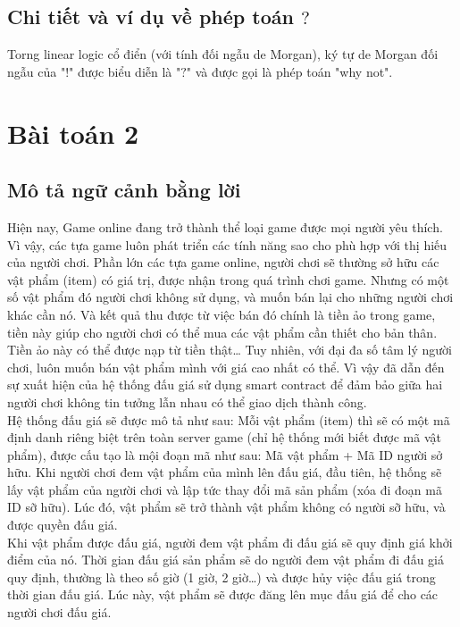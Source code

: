 \documentclass[a4paper]{article}
\begin{document}
\subsection{Chi tiết và ví dụ về phép toán $?$}
Torng linear logic cổ điển (với tính đối ngẫu de Morgan), ký tự de Morgan đối ngẫu của "$!$" được biểu diễn là "$?$" và được gọi là phép toán "why not".


\section{Bài toán 2}
\subsection{Mô tả ngữ cảnh bằng lời}

Hiện nay, Game online đang trở thành thể loại game được mọi người yêu thích. Vì vậy, các tựa game luôn phát triển các tính năng sao cho phù hợp với thị hiếu của người chơi. Phần lớn các tựa game online, người chơi sẽ thường sở hữu các vật phẩm (item) có giá trị, được nhận trong quá trình chơi game. Nhưng có một số vật phẩm đó người chơi không sử dụng, và muốn bán lại cho những người chơi khác cần nó. Và kết quả thu được từ việc bán đó chính là tiền ảo trong game, tiền này giúp cho người chơi có thể mua các vật phẩm cần thiết cho bản thân. Tiền ảo này có thể được nạp từ tiền thật… Tuy nhiên, với đại đa số tâm lý người chơi, luôn muốn bán vật phẩm mình với giá cao nhất có thể. Vì vậy đã dẫn đến sự xuất hiện của hệ thống đấu giá sử dụng smart contract để đảm bảo giữa hai người chơi không tin tưởng lẫn nhau có thể giao dịch thành công.\\

	Hệ thống đấu giá sẽ được mô tả như sau: Mỗi vật phẩm (item) thì sẽ có một mã định danh riêng biệt trên toàn server game (chỉ hệ thống mới biết được mã vật phẩm), được cấu tạo là mội đoạn mã như sau: Mã vật phẩm +  Mã ID người sở hữu. Khi người chơi đem vật phẩm của mình lên đấu giá, đầu tiên, hệ thống sẽ lấy vật phẩm của người chơi và lập tức thay đổi mã sản phẩm (xóa đi đoạn mã ID sỡ hữu). Lúc đó, vật phẩm sẽ trở thành vật phẩm không có người sỡ hữu, và được quyền đấu giá.  \\
	
Khi vật phẩm được đấu giá, người đem vật phẩm đi đấu giá sẽ quy định giá khởi điểm của nó. Thời gian đấu giá sản phẩm sẽ do người đem vật phẩm đi đấu giá quy định, thường là theo số giờ (1 giờ, 2 giờ…) và được hủy việc đấu giá trong thời gian đấu giá. Lúc này, vật phẩm sẽ được đăng lên mục đấu giá để cho các người chơi đấu giá. \\
\end{document}
